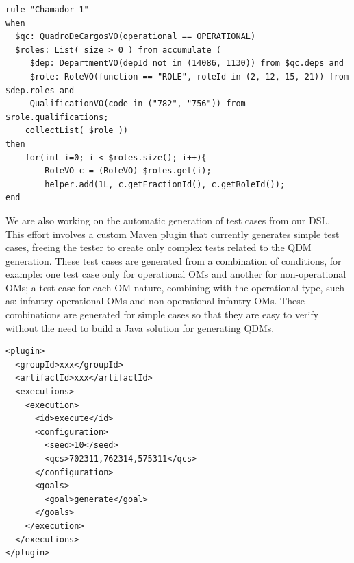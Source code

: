 \begin{lstlisting}[frame=single, float=*, language=DRL, caption={\it DRL generated}, label={code:drl}]
rule "Chamador 1"   	
when
  $qc: QuadroDeCargosVO(operational == OPERATIONAL)	
  $roles: List( size > 0 ) from accumulate ( 
     $dep: DepartmentVO(depId not in (14086, 1130)) from $qc.deps and
     $role: RoleVO(function == "ROLE", roleId in (2, 12, 15, 21)) from $dep.roles and  		
     QualificationVO(code in ("782", "756")) from $role.qualifications;				
    collectList( $role ))	 		
then		 
	for(int i=0; i < $roles.size(); i++){       	
		RoleVO c = (RoleVO) $roles.get(i);
		helper.add(1L, c.getFractionId(), c.getRoleId());   
end
\end{lstlisting}


We are also working on the automatic generation of test cases 
from our DSL. This effort involves a custom Maven plugin that currently generates simple test cases, 
freeing the tester to create only complex tests related to the QDM generation. 
These test cases are generated from a combination of conditions, for example: one test case only for operational OMs 
and another for non-operational OMs; a test case for each OM nature, combining with the operational type, 
such as: infantry operational OMs and non-operational infantry OMs. These combinations are generated for simple 
cases so that they are easy to verify without the need to build a Java solution for generating QDMs. 


\begin{lstlisting}[frame=single, language=Plugin, caption={\it Maven plugin for test generation}, label={code:plugin}]
<plugin>
  <groupId>xxx</groupId>
  <artifactId>xxx</artifactId>
  <executions>
    <execution>
      <id>execute</id>			
      <configuration>
        <seed>10</seed>				
        <qcs>702311,762314,575311</qcs>				
      </configuration>
      <goals>
        <goal>generate</goal>
      </goals>
    </execution>
  </executions>
</plugin>	
\end{lstlisting}

